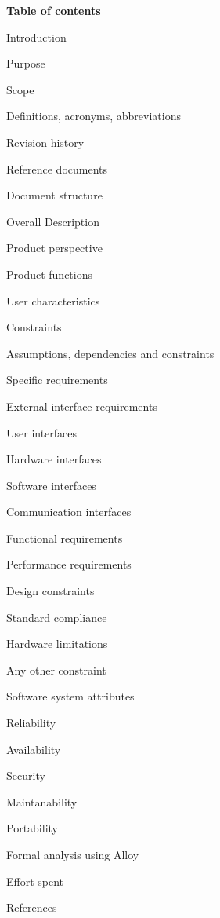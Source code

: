 \documentclass{article}
\begin{document}
\newpage
\textbf{Table of contents}
	\begin{legal}
 	\item Introduction
  		\begin{legal}
    	\item Purpose
		\item Scope
		\item Definitions, acronyms, abbreviations
		\item Revision history
		\item Reference documents
		\item Document structure	
  		\end{legal}
	\item Overall Description
  		\begin{legal}
    	\item Product perspective
		\item Product functions
		\item User characteristics
		\item Constraints
		\item Assumptions, dependencies and constraints
  		\end{legal}
	\item Specific requirements
  		\begin{legal}
    	\item External interface requirements
			\begin{legal}
			\item User interfaces
			\item Hardware interfaces
			\item Software interfaces
			\item Communication interfaces
	  		\end{legal}
		\item Functional requirements
		\item Performance requirements
		\item Design constraints
			\begin{legal}
			\item Standard compliance
			\item Hardware limitations
			\item Any other constraint
  			\end{legal}
		\item Software system attributes
			\begin{legal}
			\item Reliability
			\item Availability
			\item Security
			\item Maintanability
			\item Portability
  			\end{legal}
  		\end{legal}
	\item Formal analysis using Alloy
  	\item Effort spent
	\item References
	\end{legal}
\end{document}
